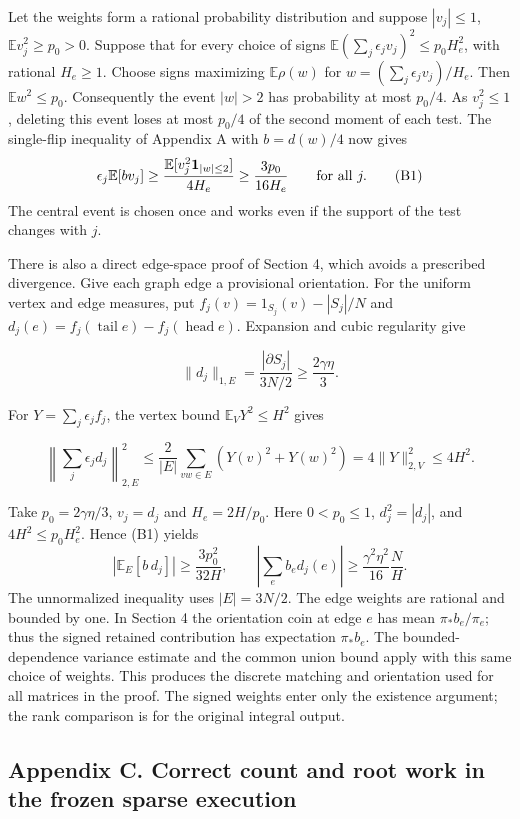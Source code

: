 \documentclass[
  11pt,
]{article}
\begin{document}
Let the weights form a rational probability distribution and suppose
\(|v_j|\le1\), \(\mathbb E v_j^2\ge p_0>0\). Suppose that for every choice
of signs \(\mathbb E(\sum_j\epsilon_jv_j)^2\le p_0 H_e^2\), with rational
\(H_e\ge1\). Choose signs maximizing \(\mathbb E\rho(w)\) for
\(w=(\sum_j\epsilon_jv_j)/H_e\). Then \(\mathbb E w^2\le p_0\).
Consequently the event \(|w|>2\) has probability at most \(p_0/4\).
As \(v_j^2\le1\), deleting this event loses at most \(p_0/4\) of the
second moment of each test. The single-flip inequality of Appendix A
with \(b=d(w)/4\) now gives
\[
 \epsilon_j\mathbb E[bv_j]\ge
 \frac{\mathbb E[v_j^2{\bf1}_{|w|\le2}]}{4H_e}
 \ge\frac{3p_0}{16H_e}\qquad\text{for all }j. \tag{B1}
\]
The central event is chosen once and works even if the support of the
test changes with \(j\).

There is also a direct edge-space proof of Section 4, which avoids a
prescribed divergence. Give each graph edge a provisional orientation.
For the uniform vertex and edge measures, put
\(f_j(v)=1_{S_j}(v)-|S_j|/N\) and
\(d_j(e)=f_j(\operatorname{tail}e)-f_j(\operatorname{head}e)\).
Expansion and cubic regularity give

\[
\|d_j\|_{1,E}=\frac{|\partial S_j|}{3N/2}\ge\frac{2\gamma\eta}{3}.
\]

For \(Y=\sum_j\epsilon_jf_j\), the vertex bound
\(\mathbb E_VY^2\le H^2\) gives

\[
\left\|\sum_j\epsilon_jd_j\right\|_{2,E}^2
\le\frac{2}{|E|}\sum_{vw\in E}(Y(v)^2+Y(w)^2)
=4\|Y\|_{2,V}^2\le4H^2.
\]

Take \(p_0=2\gamma\eta/3\), \(v_j=d_j\) and \(H_e=2H/p_0\).
Here \(0<p_0\le1\), \(d_j^2=|d_j|\), and
\(4H^2\le p_0 H_e^2\). Hence (B1) yields
\[
 |\mathbb E_E[b\,d_j]|\ge \frac{3p_0^2}{32H},\qquad
 \left|\sum_e b_e d_j(e)\right|\ge
       \frac{\gamma^2\eta^2}{16}\frac{N}{H}.                 \tag{B2}
\]
The unnormalized inequality uses \(|E|=3N/2\). The edge
weights are rational and bounded by one. In Section 4 the orientation
coin at edge \(e\) has mean \(\pi_* b_e/\pi_e\); thus the signed retained
contribution has expectation \(\pi_* b_e\). The bounded-dependence
variance estimate and the common union bound apply with this same
choice of weights. This produces the discrete matching and orientation
used for all matrices in the proof. The signed weights enter only the
existence argument; the rank comparison is for the original integral output.

\clearpage
\subsection{Appendix C. Correct count and root work in the frozen sparse execution}
\label{app:frozen-execution}
\setcounter{equation}{0}
\renewcommand*{\theequation}{C\arabic{equation}}
\renewcommand*{\theHequation}{appendixC.\arabic{equation}}
\end{document}

